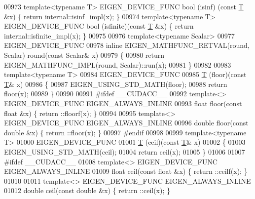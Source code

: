 \begin{DoxyCode}
00973 \textcolor{keyword}{template}<\textcolor{keyword}{typename} T> EIGEN\_DEVICE\_FUNC bool (isinf)   (\textcolor{keyword}{const} \hyperlink{group___sparse_core___module_class_eigen_1_1_triplet}{T} &x) \{ \textcolor{keywordflow}{return} internal::isinf\_impl(x); \}
00974 \textcolor{keyword}{template}<\textcolor{keyword}{typename} T> EIGEN\_DEVICE\_FUNC bool (isfinite)(\textcolor{keyword}{const} \hyperlink{group___sparse_core___module_class_eigen_1_1_triplet}{T} &x) \{ \textcolor{keywordflow}{return} internal::isfinite\_impl(x); \}
00975 
00976 \textcolor{keyword}{template}<\textcolor{keyword}{typename} Scalar>
00977 EIGEN\_DEVICE\_FUNC
00978 \textcolor{keyword}{inline} EIGEN\_MATHFUNC\_RETVAL(round, Scalar) round(\textcolor{keyword}{const} Scalar& x)
00979 \{
00980   \textcolor{keywordflow}{return} EIGEN\_MATHFUNC\_IMPL(round, Scalar)::run(x);
00981 \}
00982 
00983 \textcolor{keyword}{template}<\textcolor{keyword}{typename} T>
00984 EIGEN\_DEVICE\_FUNC
00985 \hyperlink{group___sparse_core___module_class_eigen_1_1_triplet}{T} (floor)(\textcolor{keyword}{const} \hyperlink{group___sparse_core___module_class_eigen_1_1_triplet}{T}& x)
00986 \{
00987   EIGEN\_USING\_STD\_MATH(floor);
00988   \textcolor{keywordflow}{return} floor(x);
00989 \}
00990 
00991 \textcolor{preprocessor}{#ifdef \_\_CUDACC\_\_}
00992 \textcolor{keyword}{template}<> EIGEN\_DEVICE\_FUNC EIGEN\_ALWAYS\_INLINE
00993 \textcolor{keywordtype}{float} floor(\textcolor{keyword}{const} \textcolor{keywordtype}{float} &x) \{ return ::floorf(x); \}
00994 
00995 \textcolor{keyword}{template}<> EIGEN\_DEVICE\_FUNC EIGEN\_ALWAYS\_INLINE
00996 \textcolor{keywordtype}{double} floor(\textcolor{keyword}{const} \textcolor{keywordtype}{double} &x) \{ return ::floor(x); \}
00997 \textcolor{preprocessor}{#endif}
00998 
00999 \textcolor{keyword}{template}<\textcolor{keyword}{typename} T>
01000 EIGEN\_DEVICE\_FUNC
01001 \hyperlink{group___sparse_core___module_class_eigen_1_1_triplet}{T} (ceil)(\textcolor{keyword}{const} \hyperlink{group___sparse_core___module_class_eigen_1_1_triplet}{T}& x)
01002 \{
01003   EIGEN\_USING\_STD\_MATH(ceil);
01004   \textcolor{keywordflow}{return} ceil(x);
01005 \}
01006 
01007 \textcolor{preprocessor}{#ifdef \_\_CUDACC\_\_}
01008 \textcolor{keyword}{template}<> EIGEN\_DEVICE\_FUNC EIGEN\_ALWAYS\_INLINE
01009 \textcolor{keywordtype}{float} ceil(\textcolor{keyword}{const} \textcolor{keywordtype}{float} &x) \{ return ::ceilf(x); \}
01010 
01011 \textcolor{keyword}{template}<> EIGEN\_DEVICE\_FUNC EIGEN\_ALWAYS\_INLINE
01012 \textcolor{keywordtype}{double} ceil(\textcolor{keyword}{const} \textcolor{keywordtype}{double} &x) \{ return ::ceil(x); \}

\end{DoxyCode}
